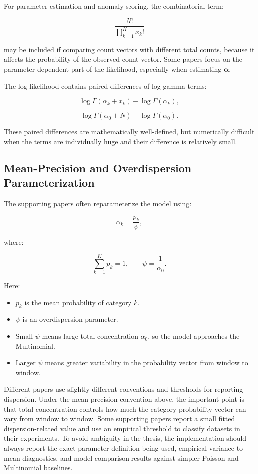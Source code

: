 \documentclass[11pt,a4paper]{article}
\begin{document}
For parameter estimation and anomaly scoring, the combinatorial term:

\[
\frac{N!}{\prod_{k=1}^{K}x_k!}
\]

may be included if comparing count vectors with different total counts, because it affects the probability of the observed count vector. Some papers focus on the parameter-dependent part of the likelihood, especially when estimating \(\boldsymbol{\alpha}\).

The log-likelihood contains paired differences of log-gamma terms:

\[
\log\Gamma(\alpha_k+x_k)-\log\Gamma(\alpha_k),
\]

\[
\log\Gamma(\alpha_0+N)-\log\Gamma(\alpha_0).
\]

These paired differences are mathematically well-defined, but numerically difficult when the terms are individually huge and their difference is relatively small.

\subsection{Mean-Precision and Overdispersion Parameterization}

The supporting papers often reparameterize the model using:

\[
\alpha_k = \frac{p_k}{\psi},
\]

where:

\[
\sum_{k=1}^{K}p_k=1,\qquad \psi=\frac{1}{\alpha_0}.
\]

Here:

\begin{itemize}
  \item \(p_k\) is the mean probability of category \(k\).
  \item \(\psi\) is an overdispersion parameter.
  \item Small \(\psi\) means large total concentration \(\alpha_0\), so the model approaches the Multinomial.
  \item Larger \(\psi\) means greater variability in the probability vector from window to window.
\end{itemize}

Different papers use slightly different conventions and thresholds for reporting dispersion. Under the mean-precision convention above, the important point is that total concentration controls how much the category probability vector can vary from window to window. Some supporting papers report a small fitted dispersion-related value and use an empirical threshold to classify datasets in their experiments. To avoid ambiguity in the thesis, the implementation should always report the exact parameter definition being used, empirical variance-to-mean diagnostics, and model-comparison results against simpler Poisson and Multinomial baselines.
\end{document}
